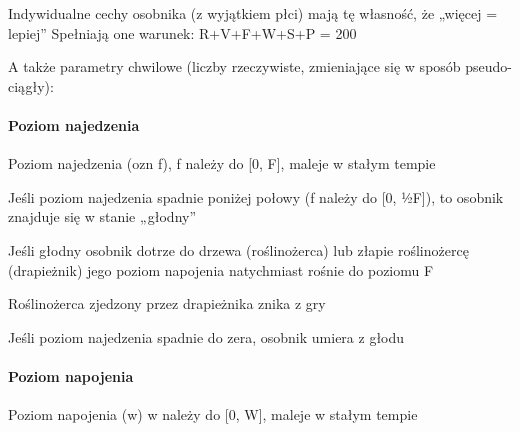 \begin{DoxyItemize}
\item Indywidualne cechy osobnika (z wyjątkiem płci) mają tę własność, że „więcej = lepiej” Spełniają one warunek\-: {\ttfamily R+\-V+\-F+\-W+\-S+\-P = 200}
\end{DoxyItemize}


\begin{DoxyItemize}
\item A także parametry chwilowe (liczby rzeczywiste, zmieniające się w sposób pseudo-\/ciągły)\-:
\end{DoxyItemize}

\paragraph*{Poziom najedzenia}

Poziom najedzenia (ozn f), f należy do \mbox{[}0, F\mbox{]}, maleje w stałym tempie


\begin{DoxyItemize}
\item Jeśli poziom najedzenia spadnie poniżej połowy (f należy do \mbox{[}0, ½\-F\mbox{]}), to osobnik znajduje się w stanie „głodny”
\end{DoxyItemize}


\begin{DoxyItemize}
\item Jeśli głodny osobnik dotrze do drzewa (roślinożerca) lub złapie roślinożercę (drapieżnik) jego poziom napojenia natychmiast rośnie do poziomu F
\end{DoxyItemize}


\begin{DoxyItemize}
\item Roślinożerca zjedzony przez drapieżnika znika z gry
\end{DoxyItemize}


\begin{DoxyItemize}
\item Jeśli poziom najedzenia spadnie do zera, osobnik umiera z głodu
\end{DoxyItemize}

\paragraph*{Poziom napojenia}


\begin{DoxyItemize}
\item Poziom napojenia (w) w należy do \mbox{[}0, W\mbox{]}, maleje w stałym tempie
\end{DoxyItemize}


